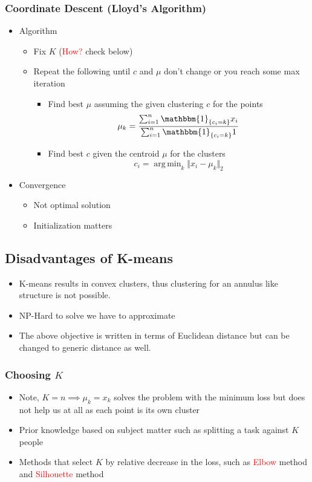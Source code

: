 \documentclass{article}
\DeclareMathOperator*{\argmin}{arg\,min}
\newcommand{\red}[1]{\textcolor{red}{#1}}
\begin{document}
\subsubsection{Coordinate Descent (Lloyd's Algorithm)}
\begin{itemize}
    \item Algorithm
        \begin{itemize}
            \item Fix $K$ (\red{How?} check below)
            \item Repeat the following until $c$ and $\mu$ don't change or you reach some max iteration
            \begin{itemize}
                \item Find best $\mu$ assuming the given clustering $c$ for the points
                    $$\mu_k = \frac{\sum_{i=1}^n \mathbbm{1}_{\{c_i=k\}} x_i}{\sum_{i=1}^n \mathbbm{1}_{\{c_i=k\}} 1}$$
                \item Find best $c$ given the centroid $\mu$ for the clusters
                    $$c_i = \argmin_{k} \Vert x_i-\mu_k \Vert_2$$
            \end{itemize}
        \end{itemize}
    \item Convergence
        \begin{itemize}
            \item Not optimal solution
            \item Initialization matters
        \end{itemize}
\end{itemize}

\subsection{Disadvantages of K-means}
\begin{itemize}
    \item K-means results in convex clusters, thus clustering for an annulus like structure is not possible.
    \item NP-Hard to solve we have to approximate
    \item The above objective is written in terms of Euclidean distance but can be changed to generic distance as well.
\end{itemize}

\subsubsection{Choosing $K$}
\begin{itemize}
    \item Note, $K=n \implies \mu_k = x_k$ solves the problem with the minimum loss but does not help us at all as each point is its own cluster
    \item Prior knowledge based on subject matter such as splitting a task against $K$ people
    \item Methods that select $K$ by relative decrease in the loss, such as \red{Elbow} method and \red{Silhouette} method
\end{itemize}
\end{document}
